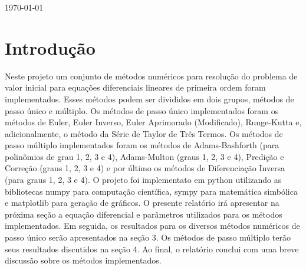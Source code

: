 \documentclass[a4paper]{article}
\begin{document}
\begin{titlepage}

{\large \today}\\[3cm] %


 

\vfill %

\end{titlepage}

\tableofcontents

\maketitle


\section{Introdução}

Neste projeto um conjunto de métodos numéricos para resolução do problema de valor inicial para equações diferenciais lineares de primeira ordem foram implementados. Esses métodos podem ser divididos em dois grupos, métodos de passo único e múltiplo. Os métodos de passo único implementados foram os métodos de Euler, Euler Inverso, Euler Aprimorado (Modificado), Runge-Kutta e, adicionalmente, o método da Série de Taylor de Três Termos. Os métodos de passo múltiplo implementados foram os métodos de Adams-Bashforth (para polinômios de grau 1, 2, 3 e 4), Adams-Multon (graus 1, 2, 3 e 4), Predição e Correção (graus 1, 2, 3 e 4) e por último os métodos de Diferenciação Inversa (para graus 1, 2, 3  e 4). O projeto foi implementato em python utilizando as bibliotecas numpy para computação científica, sympy para matemática simbólica e matplotlib para geração de gráficos. O presente relatório irá apresentar na próxima seção a equação diferencial e parâmetros utilizados para os métodos implementados. Em seguida, os resultados para os diversos métodos numéricos de passo único serão apresentados na seção 3. Os métodos de passo múltiplo terão seus resultados discutidos na seção 4. Ao final, o relatório conclui com uma breve discussão sobre os métodos implementados.
\end{document}
